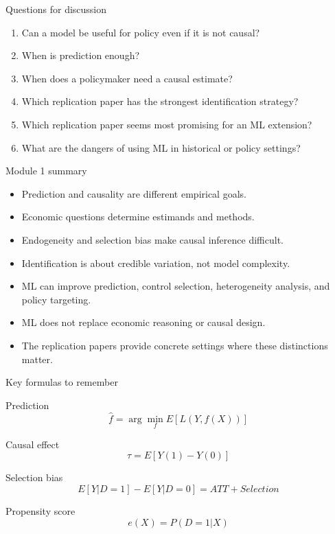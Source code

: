 \documentclass[aspectratio=169,11pt]{beamer}
\begin{document}
\begin{frame}{Questions for discussion}
\begin{enumerate}
  \item Can a model be useful for policy even if it is not causal?
  \item When is prediction enough?
  \item When does a policymaker need a causal estimate?
  \item Which replication paper has the strongest identification strategy?
  \item Which replication paper seems most promising for an ML extension?
  \item What are the dangers of using ML in historical or policy settings?
\end{enumerate}
\end{frame}

\begin{frame}{Module 1 summary}
\begin{itemize}
  \item Prediction and causality are different empirical goals.
  \item Economic questions determine estimands and methods.
  \item Endogeneity and selection bias make causal inference difficult.
  \item Identification is about credible variation, not model complexity.
  \item ML can improve prediction, control selection, heterogeneity analysis, and policy targeting.
  \item ML does not replace economic reasoning or causal design.
  \item The replication papers provide concrete settings where these distinctions matter.
\end{itemize}
\end{frame}

\begin{frame}{Key formulas to remember}
\begin{block}{Prediction}
\[
\widehat f = \arg\min_f E[L(Y,f(X))]
\]
\end{block}
\begin{block}{Causal effect}
\[
\tau = E[Y(1)-Y(0)]
\]
\end{block}
\begin{block}{Selection bias}
\[
E[Y|D=1]-E[Y|D=0] = ATT + Selection
\]
\end{block}
\begin{block}{Propensity score}
\[
e(X)=P(D=1|X)
\]
\end{block}
\end{frame}
\end{document}
